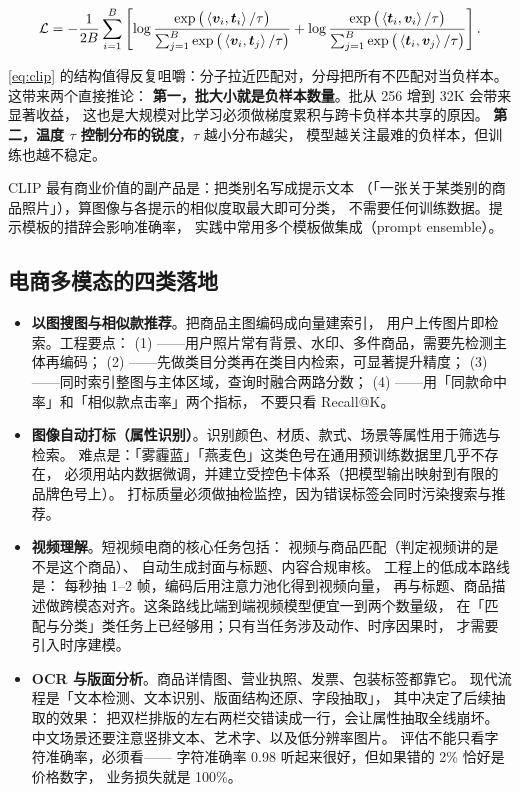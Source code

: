 \begin{equation}
\mathcal{L} = -\frac{1}{2B} \sum_{i=1}^{B}
\left[
\log \frac{\exp\big(\left\langle \bm{v}_i, \bm{t}_i \right\rangle / \tau\big)}
{\sum_{j=1}^{B} \exp\big(\left\langle \bm{v}_i, \bm{t}_j \right\rangle / \tau\big)}
+
\log \frac{\exp\big(\left\langle \bm{t}_i, \bm{v}_i \right\rangle / \tau\big)}
{\sum_{j=1}^{B} \exp\big(\left\langle \bm{t}_i, \bm{v}_j \right\rangle / \tau\big)}
\right].
\label{eq:clip}
\end{equation}

\cref{eq:clip} 的结构值得反复咀嚼：分子拉近匹配对，分母把所有不匹配对当负样本。
这带来两个直接推论：
\textbf{第一，批大小就是负样本数量}。批从 256 增到 32K 会带来显著收益，
这也是大规模对比学习必须做梯度累积与跨卡负样本共享的原因。
\textbf{第二，温度 $\tau$ 控制分布的锐度}，$\tau$ 越小分布越尖，
模型越关注最难的负样本，但训练也越不稳定。

CLIP 最有商业价值的副产品是：把类别名写成提示文本
（「一张关于某类别的商品照片」），算图像与各提示的相似度取最大即可分类，
不需要任何训练数据。提示模板的措辞会影响准确率，
实践中常用多个模板做集成（prompt ensemble）。

\subsection{电商多模态的四类落地}

\begin{itemize}
  \item \textbf{以图搜图与相似款推荐}。把商品主图编码成向量建索引，
        用户上传图片即检索。工程要点：
        (1) ——用户照片常有背景、水印、多件商品，需要先检测主体再编码；
        (2) ——先做类目分类再在类目内检索，可显著提升精度；
        (3) ——同时索引整图与主体区域，查询时融合两路分数；
        (4) ——用「同款命中率」和「相似款点击率」两个指标，
        不要只看 Recall@K。
  \item \textbf{图像自动打标（属性识别）}。识别颜色、材质、款式、场景等属性用于筛选与检索。
        难点是：「雾霾蓝」「燕麦色」这类色号在通用预训练数据里几乎不存在，
        必须用站内数据微调，并建立受控色卡体系（把模型输出映射到有限的品牌色号上）。
        打标质量必须做抽检监控，因为错误标签会同时污染搜索与推荐。
  \item \textbf{视频理解}。短视频电商的核心任务包括：
        视频与商品匹配（判定视频讲的是不是这个商品）、
        自动生成封面与标题、内容合规审核。
        工程上的低成本路线是：
        每秒抽 1--2 帧，编码后用注意力池化得到视频向量，
        再与标题、商品描述做跨模态对齐。这条路线比端到端视频模型便宜一到两个数量级，
        在「匹配与分类」类任务上已经够用；只有当任务涉及动作、时序因果时，
        才需要引入时序建模。
  \item \textbf{OCR 与版面分析}。商品详情图、营业执照、发票、包装标签都靠它。
        现代流程是「文本检测、文本识别、版面结构还原、字段抽取」，
        其中决定了后续抽取的效果：
        把双栏排版的左右两栏交错读成一行，会让属性抽取全线崩坏。
        中文场景还要注意竖排文本、艺术字、以及低分辨率图片。
        评估不能只看字符准确率，必须看——
        字符准确率 0.98 听起来很好，但如果错的 2\% 恰好是价格数字，
        业务损失就是 100\%。
\end{itemize}


